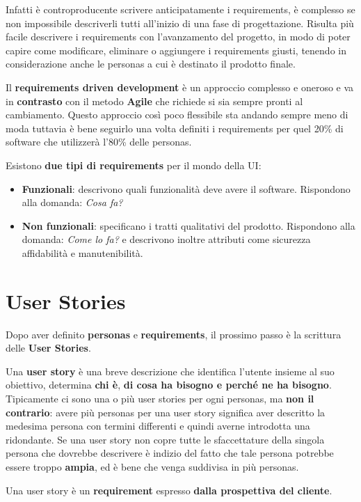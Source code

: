 \documentclass[a4paper,11pt,oneside]{book}
\begin{document}
Infatti è controproducente scrivere anticipatamente i requirements,
è complesso se non impossibile descriverli tutti all'inizio di una fase di progettazione. Risulta più facile descrivere i requirements con l'avanzamento del progetto, in modo di poter capire come modificare, eliminare o aggiungere i requirements giusti, tenendo in considerazione anche le personas a cui è destinato il prodotto finale.

Il \textbf{requirements driven development} è un approccio complesso e oneroso e va in \textbf{contrasto} con il metodo \textbf{Agile} che richiede si sia sempre pronti al cambiamento. Questo approccio così poco flessibile sta andando sempre meno di moda tuttavia è bene seguirlo una volta definiti i requirements per quel 20\% di software che utilizzerà l'80\% delle personas.

Esistono \textbf{due tipi di requirements} per il mondo della UI:

\begin{itemize}
	\item \textbf{Funzionali}:
	      descrivono quali funzionalità deve avere il software. Rispondono alla domanda:
	      \textit{Cosa fa?}
	\item \textbf{Non funzionali}: specificano i tratti qualitativi del prodotto. Rispondono alla domanda: \textit{Come lo fa?} e descrivono inoltre
	      attributi come sicurezza affidabilità e manutenibilità.
\end{itemize}

\section{User Stories}
Dopo aver definito \textbf{personas} e \textbf{requirements}, il prossimo passo è la scrittura delle \textbf{User Stories}.

Una \textbf{user story} è una breve descrizione che identifica l'utente insieme al suo
obiettivo, determina \textbf{chi è}, \textbf{di cosa ha bisogno e perché ne ha bisogno}. Tipicamente ci sono una o più user stories per ogni personas, ma \textbf{non il contrario}: avere più personas per una user story significa aver descritto la medesima persona con termini differenti e quindi averne introdotta una ridondante.
Se una user story non copre tutte le sfaccettature della singola persona che dovrebbe descrivere è indizio del fatto che tale persona potrebbe essere troppo \textbf{ampia}, ed è bene che venga suddivisa in più personas.

Una user story è un \textbf{requirement} espresso \textbf{dalla prospettiva del cliente}.
\end{document}
